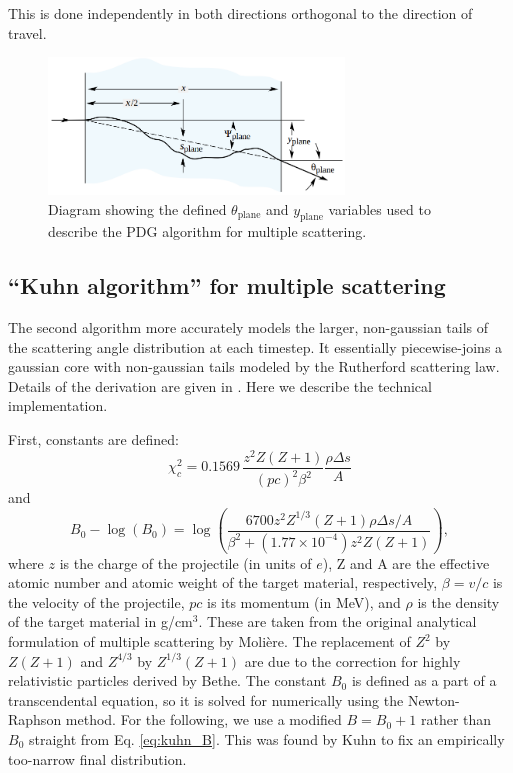 \documentclass[11pt]{article}
\begin{document}
This is done independently in both directions orthogonal to the direction of travel.

\begin{figure}
\centering
\includegraphics[width=0.7\textwidth]{plots/pdg_msc_diagram.png}
\caption{Diagram showing the defined $\theta_\text{plane}$ and $y_\text{plane}$ variables used to describe the PDG algorithm for multiple scattering.}
\label{fig:mscangles}
\end{figure}

\subsection{``Kuhn algorithm'' for multiple scattering}
\label{sec:kuhn_msc}

The second algorithm more accurately models the larger, non-gaussian tails of the scattering angle distribution at each timestep. It essentially
piecewise-joins a gaussian core with non-gaussian tails modeled by the Rutherford scattering law. Details of the derivation are given 
in \cite{kuhn_msc}. Here we describe the technical implementation.

First, constants are defined:
\begin{equation}
\chi_c^2 = 0.1569\,\frac{z^2Z(Z+1)}{(pc)^2\beta^2}\frac{\rho\Delta s}{A}
\end{equation}
and
\begin{equation}\label{eq:kuhn_B}
B_0-\log(B_0) = \log\left(\frac{6700z^2Z^{1/3}(Z+1)\rho\Delta s/A}{\beta^2+(1.77\times10^{-4})z^2Z(Z+1)}\right),
\end{equation}
where $z$ is the charge of the projectile (in units of $e$), 
Z and A are the effective atomic number and atomic weight of the target material, respectively, 
$\beta=v/c$ is the velocity of the projectile, $pc$ is its momentum (in MeV), and
$\rho$ is the density of the target material in g/cm$^3$. 
These are taken from the original analytical formulation of multiple scattering by Moli\`ere. The replacement
of $Z^2$ by $Z(Z+1)$ and $Z^{4/3}$ by $Z^{1/3}(Z+1)$ are due to the correction for highly relativistic particles
derived by Bethe. The constant $B_0$ is defined as a part of a transcendental equation, so it is solved for
numerically using the Newton-Raphson method. For the following, we use a modified $B=B_0+1$
rather than $B_0$ straight from Eq. \ref{eq:kuhn_B}. 
This was found by Kuhn to fix an empirically too-narrow final distribution.
\end{document}
